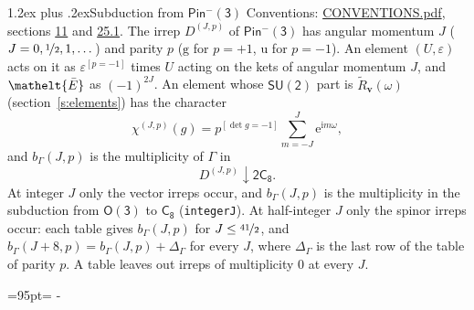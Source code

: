 \documentclass[10pt,a4paper]{article}
\makeatletter
\renewcommand\section{\@startsection{section}{1}{\z@}{-3ex plus -1ex minus -.2ex}%
  {1.2ex plus .2ex}{\normalfont\large\sffamily\bfseries\color{parttitle}}}
\newcommand{\needspace}[1]{\par\penalty-100\begingroup\dimen0=#1\relax\dimen2=\pagegoal
  \advance\dimen2-\pagetotal\ifdim\dimen0>\dimen2\relax\ifdim\dimen2>0pt\vfil\break\fi\fi
  \endgroup}
\numberwithin{equation}{section}
\newcommand{\eltfont}[1]{{\let\sigma\eltsigma\mathelt{#1}}}
\newcommand{\grp}[1]{\mathsf{#1}}
\newcommand{\elt}[1]{\eltfont{#1}}
\newcommand{\ptag}[1]{\mathrm{#1}}
\newcommand{\iverson}[1]{[#1]}
\newcommand{\restr}[2]{#1\!\downarrow#2}
\newcommand{\vv}{\mathbf{v}}
\newcommand{\iunit}{\mathrm{i}}
\newcommand{\expe}{\mathrm{e}}
\newcommand{\irrJp}[2]{D^{(#1,#2)}}
\newcommand{\barred}[1]{\bar{#1}}
\newcommand{\lift}[1]{\tilde{#1}}
\makeatother
\begin{document}
\section{Subduction from \texorpdfstring{$\grp{Pin^{-}(3)}$}{Pin(3)}}\label{s:subduction_parent}
Conventions: \href{../../CONVENTIONS.pdf}{CONVENTIONS.pdf}, sections \href{../../../rotation/CONVENTIONS.pdf\#conv.11}{11} and \href{../../CONVENTIONS.pdf\#conv.25.1}{25.1}.
\leavevmode\label{n:index.J}\label{n:index.parity}\label{n:irrep.o3}The irrep $\irrJp{J}{p}$ of \href{Pinminus3.pdf}{$\grp{Pin^{-}(3)}$} has angular momentum $J$ ($J = 0, \nicefrac{1}{2}, 1, \dots$) and parity $p$ ($\ptag{g}$ for $p = +1$, $\ptag{u}$ for $p = -1$). An element $(U, \varepsilon)$ acts on it as $\varepsilon^{[p = -1]}$ times $U$ acting on the kets of angular momentum $J$, and $\elt{\barred{E}}$ as $(-1)^{2J}$. \label{n:function.character.parent}\label{n:function.multiplicity}An element whose $\grp{SU(2)}$ part is $\lift{R}_{\vv}(\omega)$ (section~\ref{s:elements}) has the character
\begin{equation}\label{e:chi}\chi^{(J,p)}(g) = p^{\iverson{\det g = -1}}\sum_{m=-J}^{J} \expe^{\iunit m\omega},\end{equation}
and $b_\Gamma(J, p)$ is the multiplicity of $\Gamma$ in
\begin{equation}\label{e:parent}\restr{\irrJp{J}{p}}{\grp{2C_{8}}}.\end{equation}
At integer $J$ only the vector irreps occur, and $b_\Gamma(J, p)$ is the multiplicity in the subduction from $\grp{O(3)}$ to \href{../../../rotation/data/pdf/C8.pdf}{$\grp{C_{8}}$} (\texttt{integerJ}). \label{n:index.increment}At half-integer $J$ only the spinor irreps occur: each table gives $b_\Gamma(J, p)$ for $J \le \nicefrac{41}{2}$, and $b_\Gamma(J + 8, p) = b_\Gamma(J, p) + \Delta_\Gamma$ for every $J$, where $\Delta_\Gamma$ is the last row of the table of parity $p$. A table leaves out irreps of multiplicity 0 at every $J$.
\needspace{95pt}
\end{document}
